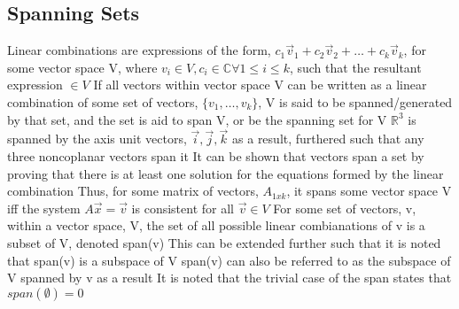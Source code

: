\documentclass[11 pt, twoside]{article}
\newenvironment{outline*}
{
	\begin{outline}[enumerate]
	}
	{\end{outline}
}
\begin{document}
\subsection{Spanning Sets}
\begin{outline*}
\1 Linear combinations are expressions of the form, $c_1\vec{v}_1 + c_2\vec{v}_2 + \dots + c_k\vec{v}_k$, for some vector space V, where $v_i \in V, c_i \in \mathbb{C} \forall 1 \leq i \leq k$, such that the resultant expression $\in V$
\2 If all vectors within vector space V can be written as a linear combination of some set of vectors, $\{v_1, \dots, v_k\}$, V is said to be spanned/generated by that set, and the set is aid to span V, or be the spanning set for V
\2 $\mathbb{R}^3$ is spanned by the axis unit vectors, $\vec{i}, \vec{j}, \vec{k}$ as a result, furthered such that any three noncoplanar vectors span it
\2 It can be shown that vectors span a set by proving that there is at least one solution for the equations formed by the linear combination
\3 Thus, for some matrix of vectors, $A_{1xk}$, it spans some vector space V iff the system $A\vec{x} = \vec{v}$ is consistent for all $\vec{v} \in V$
\1 For some set of vectors, v, within a vector space, V, the set of all possible linear combianations of v is a subset of V, denoted span(v)
\2 This can be extended further such that it is noted that span(v) is a subspace of V
\2 span(v) can also be referred to as the subspace of V spanned by v as a result
\2 It is noted that the trivial case of the span states that $span(\emptyset) = {0}$
\end{outline*}
\end{document}
